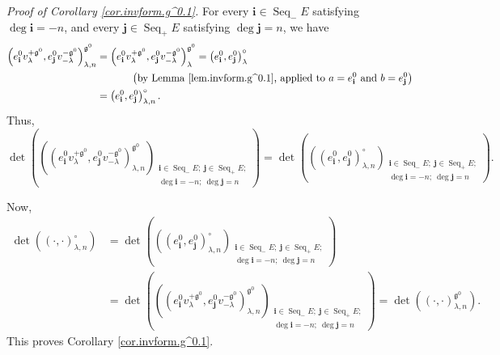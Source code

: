 \documentclass[etingof-lie.tex]{subfiles}
\begin{document}
\textit{Proof of Corollary \ref{cor.invform.g^0.1}.} For every $\mathbf{i}%
\in\operatorname*{Seq}\nolimits_{-}E$ satisfying $\deg\mathbf{i}=-n$, and
every $\mathbf{j}\in\operatorname*{Seq}\nolimits_{+}E$ satisfying
$\deg\mathbf{j}=n$, we have%
\begin{align*}
\left(  e_{\mathbf{i}}^{0}v_{\lambda}^{+\mathfrak{g}^{0}},e_{\mathbf{j}}%
^{0}v_{-\lambda}^{-\mathfrak{g}^{0}}\right)  _{\lambda,n}^{\mathfrak{g}^{0}}
&  =\left(  e_{\mathbf{i}}^{0}v_{\lambda}^{+\mathfrak{g}^{0}},e_{\mathbf{j}%
}^{0}v_{-\lambda}^{-\mathfrak{g}^{0}}\right)  _{\lambda}^{\mathfrak{g}^{0}%
}=\left(  e_{\mathbf{i}}^{0},e_{\mathbf{j}}^{0}\right)  _{\lambda}^{\circ}\\
&  \ \ \ \ \ \ \ \ \ \ \left(  \text{by Lemma \ref{lem.invform.g^0.1}, applied
to }a=e_{\mathbf{i}}^{0}\text{ and }b=e_{\mathbf{j}}^{0}\right) \\
&  =\left(  e_{\mathbf{i}}^{0},e_{\mathbf{j}}^{0}\right)  _{\lambda,n}^{\circ
}.
\end{align*}
Thus,%
\[
\det\left(  \left(  \left(  e_{\mathbf{i}}^{0}v_{\lambda}^{+\mathfrak{g}^{0}%
},e_{\mathbf{j}}^{0}v_{-\lambda}^{-\mathfrak{g}^{0}}\right)  _{\lambda
,n}^{\mathfrak{g}^{0}}\right)  _{\substack{\mathbf{i}\in\operatorname*{Seq}%
\nolimits_{-}E;\ \mathbf{j}\in\operatorname*{Seq}\nolimits_{+}E;\\\deg
\mathbf{i}=-n;\ \deg\mathbf{j}=n}}\right)  =\det\left(  \left(  \left(
e_{\mathbf{i}}^{0},e_{\mathbf{j}}^{0}\right)  _{\lambda,n}^{\circ}\right)
_{\substack{\mathbf{i}\in\operatorname*{Seq}\nolimits_{-}E;\ \mathbf{j}%
\in\operatorname*{Seq}\nolimits_{+}E;\\\deg\mathbf{i}=-n;\ \deg\mathbf{j}%
=n}}\right)  .
\]


Now,%
\begin{align*}
\det\left(  \left(  \cdot,\cdot\right)  _{\lambda,n}^{\circ}\right)   &
=\det\left(  \left(  \left(  e_{\mathbf{i}}^{0},e_{\mathbf{j}}^{0}\right)
_{\lambda,n}^{\circ}\right)  _{\substack{\mathbf{i}\in\operatorname*{Seq}%
\nolimits_{-}E;\ \mathbf{j}\in\operatorname*{Seq}\nolimits_{+}E;\\\deg
\mathbf{i}=-n;\ \deg\mathbf{j}=n}}\right) \\
&  =\det\left(  \left(  \left(  e_{\mathbf{i}}^{0}v_{\lambda}^{+\mathfrak{g}%
^{0}},e_{\mathbf{j}}^{0}v_{-\lambda}^{-\mathfrak{g}^{0}}\right)  _{\lambda
,n}^{\mathfrak{g}^{0}}\right)  _{\substack{\mathbf{i}\in\operatorname*{Seq}%
\nolimits_{-}E;\ \mathbf{j}\in\operatorname*{Seq}\nolimits_{+}E;\\\deg
\mathbf{i}=-n;\ \deg\mathbf{j}=n}}\right)  =\det\left(  \left(  \cdot
,\cdot\right)  _{\lambda,n}^{\mathfrak{g}^{0}}\right)  .
\end{align*}
This proves Corollary \ref{cor.invform.g^0.1}.
\end{document}
